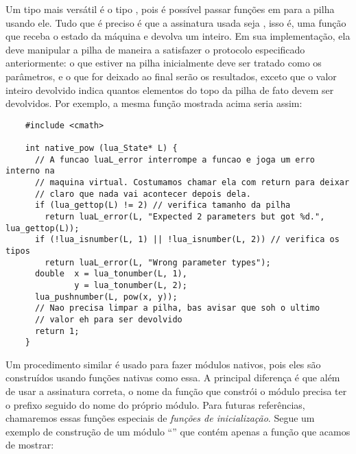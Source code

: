       Um tipo mais versátil é o tipo , pois é possível passar
      funções em \C{} para a pilha usando ele. Tudo que é preciso é que a
      assinatura usada seja , isso é, uma
      função que receba o estado da máquina e devolva um inteiro. Em sua
      implementação, ela deve manipular a pilha de maneira a satisfazer o
      protocolo especificado anteriormente: o que estiver na pilha inicialmente
      deve ser tratado como os parâmetros, e o que for deixado ao final serão
      os resultados, exceto que o valor inteiro devolvido indica quantos
      elementos do topo da pilha de fato devem ser devolvidos. Por exemplo, a
      mesma função  mostrada acima seria assim:

      \vspace{1em}

    \begin{lstlisting}
    #include <cmath>

    int native_pow (lua_State* L) {
      // A funcao luaL_error interrompe a funcao e joga um erro interno na
      // maquina virtual. Costumamos chamar ela com return para deixar
      // claro que nada vai acontecer depois dela.
      if (lua_gettop(L) != 2) // verifica tamanho da pilha
        return luaL_error(L, "Expected 2 parameters but got %d.", lua_gettop(L));
      if (!lua_isnumber(L, 1) || !lua_isnumber(L, 2)) // verifica os tipos
        return luaL_error(L, "Wrong parameter types");
      double  x = lua_tonumber(L, 1),
              y = lua_tonumber(L, 2);
      lua_pushnumber(L, pow(x, y));
      // Nao precisa limpar a pilha, bas avisar que soh o ultimo
      // valor eh para ser devolvido
      return 1;
    }
    \end{lstlisting}

      \vspace{1em}

      Um procedimento similar é usado para fazer módulos nativos, pois eles são
      construídos usando funções nativas como essa. A principal diferença é que
      além de usar a assinatura correta, o nome da função que constrói o módulo
      precisa ter o prefixo  seguido do nome do próprio módulo.
      Para futuras referências, chamaremos essas funções especiais de
      \emph{funções de inicialização}. Segue um exemplo de construção de um
      módulo ``'' que contém apenas a função 
      que acamos de mostrar:

      \vspace{1em}

